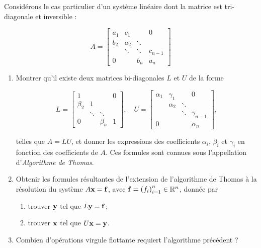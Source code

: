 Considérons le cas particulier d'un système linéaire dont la matrice est tri-diagonale et inversible :

\begin{equation*}
  A = 
  \begin{bmatrix}
      a_1   & c_1     &             &   0        \\
      b_2   & a_2     & \ddots      &           \\
            & \ddots  & \ddots      & c_{n-1}        \\
        0   &         &    b_{n}    &     a_{n}
    \end{bmatrix}
\end{equation*}

\begin{enumerate}[label=\alph*)]
  \item Montrer qu'il existe deux matrices bi-diagonales $L$ et $U$ de la forme
  
  \begin{equation*}
    L = 
    \begin{bmatrix}
          1       &         &             &   0        \\
        \beta_2   & 1       &             &           \\
                  & \ddots  &   \ddots    &          \\
          0       &         &  \beta_{n}  &     1
      \end{bmatrix}
      , 
      \quad
      U = 
      \begin{bmatrix}
            \alpha_{1}  &    \gamma_{1}     &             &   0        \\
                        &    \alpha_{2}     &    \ddots   &           \\
                        &                   &   \ddots    & \gamma_{n-1}     \\
            0           &                   &             & \alpha_{n}
        \end{bmatrix}
        ,
  \end{equation*}
  
  telles que $A = LU$, et donner les expressions des coefficients $\alpha_{i}$, $\beta_{i}$ et $\gamma_{i}$ en fonction des coefficients de $A$.
  Ces formules sont connues sous l'appellation d'\textit{Algorithme de Thomas}.
  
  \item Obtenir les formules résultantes de l'extension de l'algorithme de Thomas à la résolution du système $A \mathbf{x} = \mathbf{f}$, avec $\mathbf{f} = \left(f_{i}\right)^{n}_{i=1} \in \mathbb{R}^{n}$, donnée par
    \begin{enumerate}[label=(\alph*)]
      \item trouver $\mathbf{y}$ tel que $L \mathbf{y} = \mathbf{f}$;
      \item trouver $\mathbf{x}$ tel que $U \mathbf{x} = \mathbf{y}$.
    \end{enumerate}
    
  \item Combien d'opérations virgule flottante requiert l'algorithme précédent ?

\end{enumerate}








